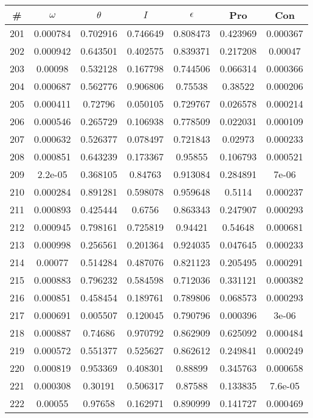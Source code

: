 \newpage
\begin{table}
\begin{tabular}{c|c|c|c|c|c|c}
\# & $\omega$ & $\theta$ & $I$ & $\epsilon$ & Pro & Con\\
\hline
201 & 0.000784 & 0.702916 & 0.746649 & 0.808473 & 0.423969 & 0.000367\\
202 & 0.000942 & 0.643501 & 0.402575 & 0.839371 & 0.217208 & 0.00047\\
203 & 0.00098 & 0.532128 & 0.167798 & 0.744506 & 0.066314 & 0.000366\\
204 & 0.000687 & 0.562776 & 0.906806 & 0.75538 & 0.38522 & 0.000206\\
205 & 0.000411 & 0.72796 & 0.050105 & 0.729767 & 0.026578 & 0.000214\\
206 & 0.000546 & 0.265729 & 0.106938 & 0.778509 & 0.022031 & 0.000109\\
207 & 0.000632 & 0.526377 & 0.078497 & 0.721843 & 0.02973 & 0.000233\\
208 & 0.000851 & 0.643239 & 0.173367 & 0.95855 & 0.106793 & 0.000521\\
209 & 2.2e-05 & 0.368105 & 0.84763 & 0.913084 & 0.284891 & 7e-06\\
210 & 0.000284 & 0.891281 & 0.598078 & 0.959648 & 0.5114 & 0.000237\\
211 & 0.000893 & 0.425444 & 0.6756 & 0.863343 & 0.247907 & 0.000293\\
212 & 0.000945 & 0.798161 & 0.725819 & 0.94421 & 0.54648 & 0.000681\\
213 & 0.000998 & 0.256561 & 0.201364 & 0.924035 & 0.047645 & 0.000233\\
214 & 0.00077 & 0.514284 & 0.487076 & 0.821123 & 0.205495 & 0.000291\\
215 & 0.000883 & 0.796232 & 0.584598 & 0.712036 & 0.331121 & 0.000382\\
216 & 0.000851 & 0.458454 & 0.189761 & 0.789806 & 0.068573 & 0.000293\\
217 & 0.000691 & 0.005507 & 0.120045 & 0.790796 & 0.000396 & 3e-06\\
218 & 0.000887 & 0.74686 & 0.970792 & 0.862909 & 0.625092 & 0.000484\\
219 & 0.000572 & 0.551377 & 0.525627 & 0.862612 & 0.249841 & 0.000249\\
220 & 0.000819 & 0.953369 & 0.408301 & 0.88899 & 0.345763 & 0.000658\\
221 & 0.000308 & 0.30191 & 0.506317 & 0.87588 & 0.133835 & 7.6e-05\\
222 & 0.00055 & 0.97658 & 0.162971 & 0.890999 & 0.141727 & 0.000469\\

\end{tabular}
\end{table}
